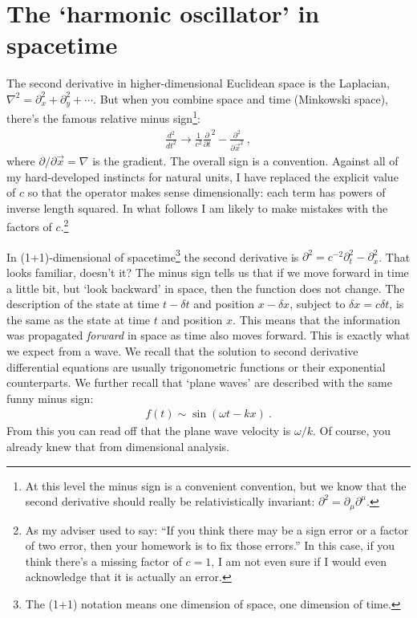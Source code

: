 \section{The `harmonic oscillator' in spacetime}
The second derivative in higher-dimensional Euclidean space is the Laplacian, $\nabla^2= \partial_x^2 + \partial_y^2 +\cdots$. But when you combine space and time (Minkowski space), there's the famous relative minus sign\footnote{At this level the minus sign is a convenient convention, but we know that the second derivative should really be relativistically invariant: $\partial^2 = \partial_\mu \partial^\mu$.}:
\begin{align}
  \frac{d^2}{dt^2}
  \to 
  \frac{1}{c^2}
  \frac{\partial}{\partial t}^2
  -
  \frac{\partial^2}
  {\partial \vec x^2} \ ,
\end{align}
where $\partial/\partial\vec x = \nabla$ is the gradient. The overall sign is a convention. Against all of my hard-developed instincts for natural units, I have replaced the explicit value of $c$ so that the operator makes sense dimensionally: each term has powers of inverse length squared. In what follows I am likely to make mistakes with the factors of $c$.\footnote{As my adviser used to say: ``If you think there may be a sign error or a factor of two error, then your homework is to fix those errors.'' In this case, if you think there's a missing factor of $c=1$, I am not even sure if I would even acknowledge that it is actually an error.} 

In (1+1)-dimensional of spacetime\footnote{The (1+1) notation means one dimension of space, one dimension of time.} the second derivative is $\partial^2 = c^{-2} \partial_t^2 - \partial_x^2$. That looks familiar, doesn't it? The minus sign tells us that if we move forward in time a little bit, but `look backward' in space, then the function does not change. The description of the state at time $t-\delta t$ and position $x-\delta x$, subject to $\delta x = c\delta t$, is the same as the state at time $t$ and position $x$. 
%
This means that the information was propagated \emph{forward} in space as time also moves forward. This is exactly what we expect from a wave. We recall that the solution to second derivative differential equations are usually trigonometric functions or their exponential counterparts. We further recall that `plane waves' are described with the same funny minus sign:
\begin{align}
  f(t) \sim \sin (\omega t - kx) \ .
  \label{eq:plane:wave}
\end{align}
From this you can read off that the plane wave velocity is $\omega/k$. Of course, you already knew that from dimensional analysis. 


